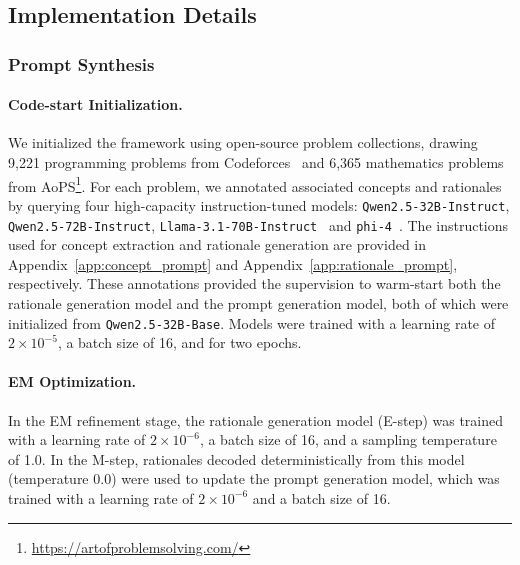   
  
  
  \subsection{Implementation Details}
  
  \subsubsection{Prompt Synthesis}
  
  \paragraph{Code-start Initialization.} 
  We initialized the framework using open-source problem collections, drawing 9,221 programming problems from Codeforces~\citep{penedo2025codeforces} and 6,365 mathematics problems from AoPS\footnote{\url{https://artofproblemsolving.com/}}. 
  For each problem, we annotated associated concepts and rationales by querying four high-capacity instruction-tuned models: \texttt{Qwen2.5-32B-Instruct}, \texttt{Qwen2.5-72B-Instruct}, \texttt{Llama-3.1-70B-Instruct}~\citep{grattafiori2024llama} and \texttt{phi-4}~\citep{abdin2024phi}. 
  The instructions used for concept extraction and rationale generation are provided in Appendix~\ref{app:concept_prompt} and Appendix~\ref{app:rationale_prompt}, respectively.
  These annotations provided the supervision to warm-start both the rationale generation model and the prompt generation model, both of which were initialized from \texttt{Qwen2.5-32B-Base}. 
  Models were trained with a learning rate of $2 \times 10^{-5}$, a batch size of 16, and for two epochs. 
  
  
  
  \paragraph{EM Optimization.} 
  In the EM refinement stage, the rationale generation model (E-step) was trained with a learning rate of $2 \times 10^{-6}$, a batch size of 16, and a sampling temperature of 1.0.  
  In the M-step, rationales decoded deterministically from this model (temperature 0.0) were used to update the prompt generation model, which was trained with a learning rate of $2 \times 10^{-6}$ and a batch size of 16.  
  
